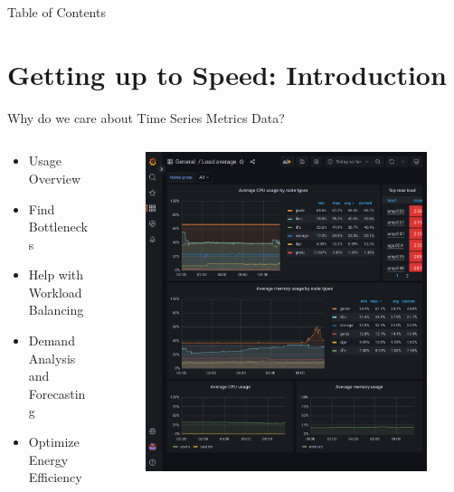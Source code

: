 \documentclass[compress,aspectratio=169]{beamer}
\begin{document}
\begin{frame}[plain]
	\titlepage
\end{frame}

\begin{frame}[t]{Table of Contents}
  \tableofcontents[subsectionstyle=hide/hide]
\end{frame}


\section[Introduction]{Getting up to Speed: Introduction}
\begin{frame}{Why do we care about Time Series Metrics Data?}
\begin{columns}[T]
\begin{column}{0.5\textwidth}
\begin{itemize}
  \item Usage Overview
  \item Find Bottlenecks
  \item Help with Workload Balancing
  \item Demand Analysis and Forecasting
  \item Optimize Energy Efficiency
\end{itemize}
\end{column}
\begin{column}{0.5\textwidth}
\begin{figure}
  \includegraphics[height=.8\textheight]{example_grafana_dashboard.png}
\end{figure}
\end{column}
\end{columns}
\end{frame}
\end{document}
